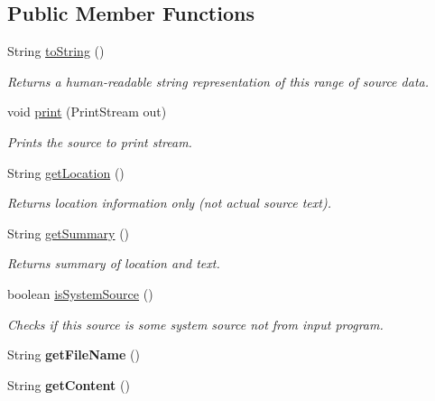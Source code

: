 \subsection*{Public Member Functions}
\begin{DoxyCompactItemize}
\item 
String \hyperlink{interfaceedu_1_1udel_1_1cis_1_1vsl_1_1civl_1_1model_1_1IF_1_1CIVLSource_a90228d2ab6a936d9eda1e7eee95105d1}{to\+String} ()
\begin{DoxyCompactList}\small\item\em Returns a human-\/readable string representation of this range of source data. \end{DoxyCompactList}\item 
void \hyperlink{interfaceedu_1_1udel_1_1cis_1_1vsl_1_1civl_1_1model_1_1IF_1_1CIVLSource_aaa173473e30f658074f8a31d9f35d29a}{print} (Print\+Stream out)
\begin{DoxyCompactList}\small\item\em Prints the source to print stream. \end{DoxyCompactList}\item 
String \hyperlink{interfaceedu_1_1udel_1_1cis_1_1vsl_1_1civl_1_1model_1_1IF_1_1CIVLSource_a500dc156686efa1cb44d0baa89d4030e}{get\+Location} ()
\begin{DoxyCompactList}\small\item\em Returns location information only (not actual source text). \end{DoxyCompactList}\item 
String \hyperlink{interfaceedu_1_1udel_1_1cis_1_1vsl_1_1civl_1_1model_1_1IF_1_1CIVLSource_a0fa9632f1ddbef02e4eb851b138e8639}{get\+Summary} ()
\begin{DoxyCompactList}\small\item\em Returns summary of location and text. \end{DoxyCompactList}\item 
boolean \hyperlink{interfaceedu_1_1udel_1_1cis_1_1vsl_1_1civl_1_1model_1_1IF_1_1CIVLSource_abdd4d6534e284bdcb43b515d03cfbeb3}{is\+System\+Source} ()
\begin{DoxyCompactList}\small\item\em Checks if this source is some system source not from input program. \end{DoxyCompactList}\item 
\hypertarget{interfaceedu_1_1udel_1_1cis_1_1vsl_1_1civl_1_1model_1_1IF_1_1CIVLSource_a7914816d096401c7e8aa8d0984778a8d}{}String {\bfseries get\+File\+Name} ()\label{interfaceedu_1_1udel_1_1cis_1_1vsl_1_1civl_1_1model_1_1IF_1_1CIVLSource_a7914816d096401c7e8aa8d0984778a8d}

\item 
\hypertarget{interfaceedu_1_1udel_1_1cis_1_1vsl_1_1civl_1_1model_1_1IF_1_1CIVLSource_a5edf1b6dd8a59c63c85d8a8bbbe04b96}{}String {\bfseries get\+Content} ()\label{interfaceedu_1_1udel_1_1cis_1_1vsl_1_1civl_1_1model_1_1IF_1_1CIVLSource_a5edf1b6dd8a59c63c85d8a8bbbe04b96}

\end{DoxyCompactItemize}


